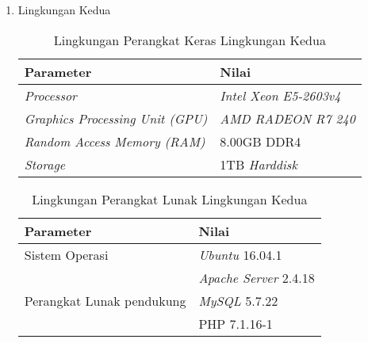\begin{enumerate}
	\item Lingkungan Kedua
	\begin{table}[H] %
		\caption{Lingkungan Perangkat Keras Lingkungan Kedua}
		\centering
		\label{tab:lingkunganpkpe}
		\begin{tabular}{|l|l|}
			\hline
			\textbf{Parameter} & \textbf{Nilai} \\
			\hline
			\textit{Processor} & \textit{Intel Xeon E5-2603v4}\\
			\hline
			\textit{Graphics Processing Unit (GPU)} & \textit{AMD RADEON R7 240}\\
			\hline
			\textit{Random Access Memory (RAM)}& 8.00GB DDR4\\
			\hline
			\textit{Storage} & 1TB \textit{Harddisk}\\
			\hline
		\end{tabular}%
	\end{table}
	
	\begin{table}[h] %
		\caption{Lingkungan Perangkat Lunak Lingkungan Kedua}
		\label{tab:lingkunganplpe}
		\centering
		\begin{tabular}{|l|l|}
			\hline
			\textbf{Parameter} & \textbf{Nilai} \\
			\hline
			Sistem Operasi & \textit{Ubuntu} 16.04.1\\
			\hline
			\multirow{4}{*}{Perangkat Lunak pendukung} 	& \textit{Apache Server} 2.4.18\\
			& \textit{MySQL} 5.7.22\\
			& PHP 7.1.16-1\\
			\hline
		\end{tabular}%
	\end{table}
\end{enumerate}


